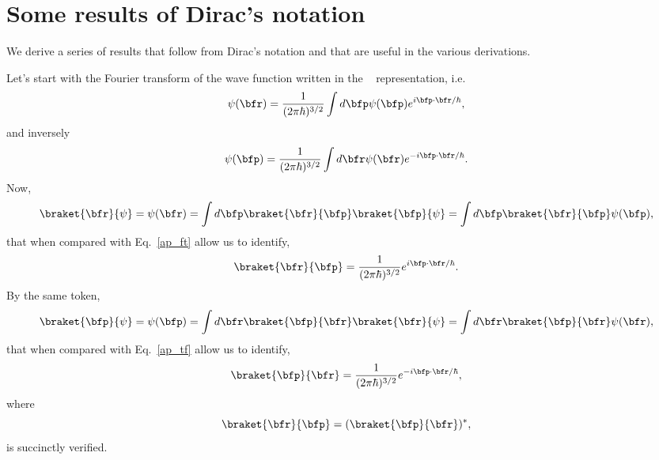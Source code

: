\section{Some results of Dirac's notation}\label{ap_dirac}

We derive a series of results that follow from Dirac's notation and
that are  useful in the various derivations.

Let's start with the Fourier transform of the wave function written in
the \sch~ representation, i.e.
\begin{equation}\label{ap_ft}
\psi(\bfr) = \frac{1}{(2\pi\hbar)^{3/2}}\int d\bfp \psi(\bfp)e^{i\bfp\cdot\bfr/\hbar}
,
\end{equation}  
and inversely 
\begin{equation}\label{ap_tf}
\psi(\bfp) = \frac{1}{(2\pi\hbar)^{3/2}}\int d\bfr \psi(\bfr)
e^{-i\bfp\cdot\bfr/\hbar}
.
\end{equation}  
Now,
\begin{equation}\label{rpsi}
\braket{\bfr}{\psi}=\psi(\bfr)=\int d\bfp \braket{\bfr}{\bfp}\braket{\bfp}{\psi}=
\int d\bfp \braket{\bfr}{\bfp}\psi(\bfp)
,
\end{equation}
that when compared with Eq.~\eqref{ap_ft} allow us to identify,
\begin{equation}\label{rp2}
\braket{\bfr}{\bfp}=\frac{1}{(2\pi\hbar)^{3/2}}e^{i\bfp\cdot\bfr/\hbar}
.
\end{equation}
By the same token,
\begin{equation}\label{rpsi2}
\braket{\bfp}{\psi}=\psi(\bfp)=\int d\bfr \braket{\bfp}{\bfr}\braket{\bfr}{\psi}=
\int d\bfr \braket{\bfp}{\bfr}\psi(\bfr)
,
\end{equation}
that when compared with Eq.~\eqref{ap_tf} allow us to identify,
\begin{equation}\label{rp}
\braket{\bfp}{\bfr}=\frac{1}{(2\pi\hbar)^{3/2}}e^{-i\bfp\cdot\bfr/\hbar}
,
\end{equation}
where
\begin{equation}\label{ap_good}
\braket{\bfr}{\bfp}=(\braket{\bfp}{\bfr})^*
,
\end{equation}
is succinctly verified.
 
